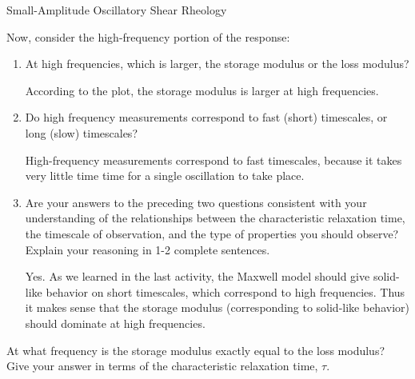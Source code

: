 \begin{activity}[extension]{Small-Amplitude Oscillatory Shear Rheology}
\begin{ctqs}
\begin{enumerate}
\begin{solution}[2in]
				\end{solution}
	
		\end{enumerate}
	
	\question Now, consider the high-frequency portion of the response:
	
		\begin{enumerate}
		
			\item At high frequencies, which is larger, the storage modulus or the loss modulus?
	
					\begin{solution}[1in]
					
						According to the plot, the storage modulus is larger at high frequencies.
					
					\end{solution}
					
			\item Do high frequency measurements correspond to fast (short) timescales, or long (slow) timescales?
			
				\begin{solution}[1in]
				
					High-frequency measurements correspond to fast timescales, because it takes very little time time for a single oscillation to take place.
				
				\end{solution}
					
			\item Are your answers to the preceding two questions consistent with your understanding of the relationships between the characteristic relaxation time, the timescale of observation, and the type of properties you should observe?  Explain your reasoning in 1-2 complete sentences.
			
				\begin{solution}[2in]
				
					Yes. As we learned in the last activity, the Maxwell model should give solid-like behavior on short timescales, which correspond to high frequencies.  Thus it makes sense that the storage modulus (corresponding to solid-like behavior) should dominate at high frequencies.
				
				\end{solution}
	\end{enumerate}

	\question At what frequency is the storage modulus exactly equal to the loss modulus?  Give your answer in terms of the characteristic relaxation time, $\tau$.
	

\end{ctqs}
\end{activity}
